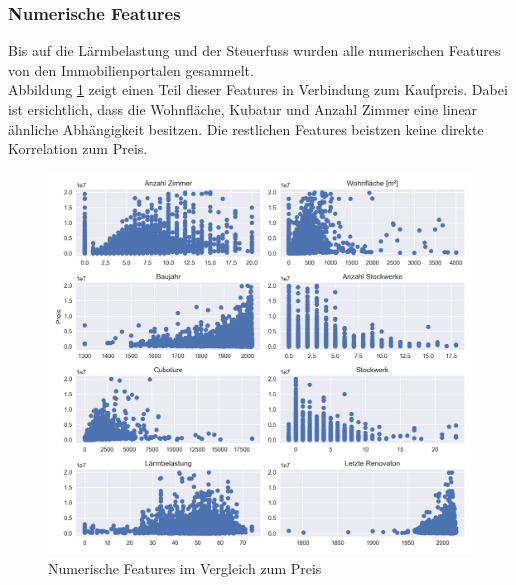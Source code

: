 \begin{table}[ht]
\centering
{}
\caption{Statistische Werte des Kaufpreises}
\label{tab:price}
\end{table}

\subsubsection{Numerische Features}
Bis auf die Lärmbelastung und der Steuerfuss wurden alle numerischen Features von den Immobilienportalen gesammelt.\\
Abbildung \ref{fig:num_features} zeigt einen Teil dieser Features in Verbindung zum Kaufpreis. Dabei ist ersichtlich, dass die Wohnfläche, Kubatur und Anzahl Zimmer eine linear ähnliche Abhängigkeit besitzen. Die restlichen Features beistzen keine direkte Korrelation zum Preis.

\begin{figure}[h]
\centering
\includegraphics[width=\textwidth]{images/Vergleich_zum_preis.png}
\caption[Numerische Features im Vergleich zum Preis]{Numerische Features im Vergleich zum Preis}%
\label{fig:num_features}
\end{figure}

